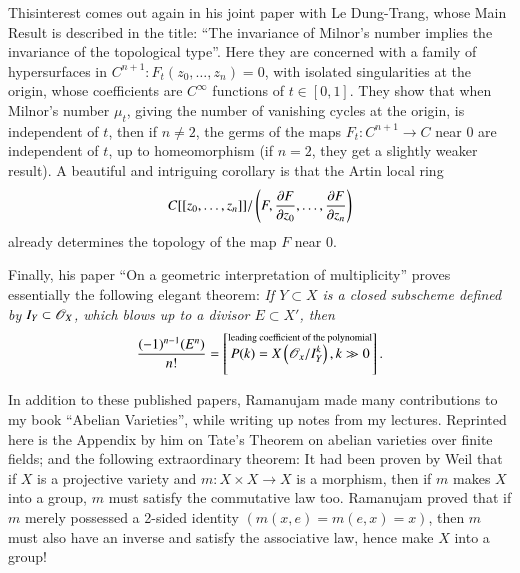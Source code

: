 This\pageoriginale interest comes out again in his joint paper with Le 
Dung-Trang, whose Main Result is described in the title: ``The 
invariance of Milnor's number implies the invariance of the 
topological type''. Here they are concerned with a family of 
hypersurfaces in $C^{n+1}:F_t(z_0,\ldots,z_n)=0$, with isolated 
singularities at the origin, whose coefficients are $C^\infty$ 
functions of $t\in[0, 1]$. They show that when Milnor's number 
$\mu_t$, giving the number of vanishing cycles at the origin, is 
independent of $t$, then if $n\neq 2$, the germs of the maps 
$F_t:C^{n+1}\to C$ near $0$ are independent of $t$, up to 
homeomorphism (if $n=2$, they get a slightly weaker result). A 
beautiful and intriguing corollary is that the Artin local ring
$$
C[[z_0,\ldots,z_n]]/\left({F,\frac{\partial F}{\partial z_0},\ldots, 
\frac{\partial F}{\partial z_n}}\right)
$$
already determines the topology of the map $F$ near $0$.

Finally, his paper ``On a geometric interpretation of multiplicity'' 
proves essentially the following elegant theorem: \emph{If $Y\subset X$ is a 
closed subscheme defined by $I_Y\subset\mathscr{O}_X$, which blows up to a 
divisor $E\subset X'$, then
$$
\frac{(-1)^{n-1}(E^n)}{n!}=\left[{\overset{\text{leading coefficient of 
the polynomial}}{P(k)=X\left({\mathscr{O}_x/I_Y^k}\right),k\gg 0}}\right].
$$}

In addition to these published papers, Ramanujam made many 
contributions to my book ``Abelian Varieties'', while writing up notes 
from my lectures. Reprinted here is the Appendix by him on Tate's 
Theorem on abelian varieties over finite fields; and the following 
extraordinary theorem: It had been proven by Weil that if $X$ is a 
projective variety and $m:X\times X\to X$ is a morphism, then if $m$ 
makes $X$ into a group, $m$ must satisfy the commutative law too. 
Ramanujam proved that if $m$ merely possessed a 2-sided identity 
$(m(x,e)=m(e,x)=x)$, then $m$ must also have an inverse and satisfy 
the associative law, hence make $X$ into a group!
